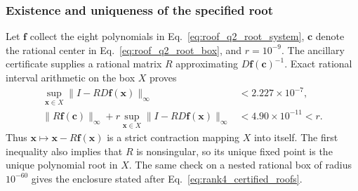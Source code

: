 \documentclass[11pt]{article}
\begin{document}
\subsubsection{Existence and uniqueness of the specified root}
Let $\mathbf f$ collect the eight polynomials in Eq.~\eqref{eq:roof_q2_root_system}, $\mathbf c$ denote the rational center in Eq.~\eqref{eq:roof_q2_root_box}, and $r=10^{-9}$. The ancillary certificate supplies a rational matrix $R$ approximating $D\mathbf f(\mathbf c)^{-1}$. Exact rational interval arithmetic on the box $X$ proves
\begin{align}
 \sup_{\mathbf x\in X}\|I-RD\mathbf f(\mathbf x)\|_\infty
 &<2.227\times10^{-7},\\
 \|R\mathbf f(\mathbf c)\|_\infty
 +r\sup_{\mathbf x\in X}\|I-RD\mathbf f(\mathbf x)\|_\infty
 &<4.90\times10^{-11}<r.\nonumber
\end{align}
Thus $\mathbf x\mapsto\mathbf x-R\mathbf f(\mathbf x)$ is a strict contraction mapping $X$ into itself. The first inequality also implies that $R$ is nonsingular, so its unique fixed point is the unique polynomial root in $X$. The same check on a nested rational box of radius $10^{-60}$ gives the enclosure stated after Eq.~\eqref{eq:rank4_certified_roofs}.
\end{document}

